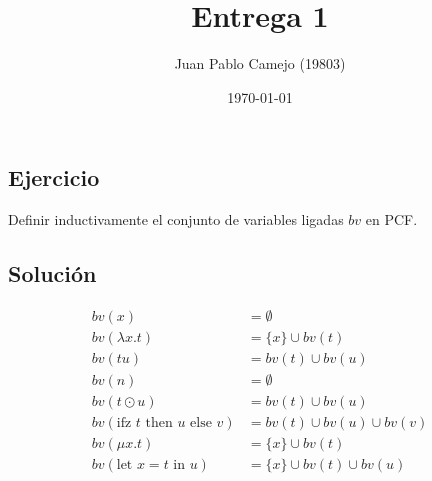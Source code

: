 \documentclass[a4paper,10pt]{article} %
\title{Entrega 1}
\author{Juan Pablo Camejo (19803)}
\date{\today}  %
\begin{document}
\maketitle   %

\subsection*{Ejercicio}
Definir inductivamente el conjunto de variables ligadas $bv$ en PCF.
\subsection*{Solución}

$$
\begin{aligned}
    bv(x) &= \emptyset\\
    bv(\lambda x.t) &= \{x\} \cup bv(t) \\
    bv(tu) &= bv(t)\cup bv(u)\\
    bv(n) &= \emptyset\\
    bv(t\odot u) &= bv(t)\cup bv(u)\\
    bv(\text{ifz } t \text{ then } u \text{ else } v) &= bv(t)\cup bv(u) \cup bv(v)\\
    bv(\mu x.t) &= \{x\} \cup bv(t)\\
    bv(\text{let } x = t \text{ in } u) &= \{x\} \cup bv(t) \cup bv(u)\\
\end{aligned}
$$
\end{document}
